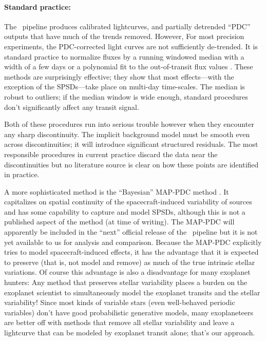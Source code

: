 \documentclass[letterpaper,12pt,preprint]{hack_aastex}
\begin{document}
\paragraph{Standard practice:}
The \Kepler\ pipeline produces calibrated lightcurves, and partially
detrended ``PDC'' outputs that have much of the trends removed.
However, For most precision experiments, the PDC-corrected light curves
are not sufficiently de-trended.
It is standard practice to normalize fluxes by a
running windowed median with a width of a few days \citep{dressing} or a
polynomial fit to the out-of-transit flux values \citep[regions chosen by
hand;][]{autokep}.
These methods are surprisingly effective; they show that most effects---with
the exception of the SPSDs---take place on multi-day time-scales.
The median is robust to outliers; if the median window is
wide enough, standard procedures don't significantly affect any
transit signal.

Both of these procedures run into serious trouble however when they encounter
any sharp discontinuity.
The implicit background model must be smooth even across discontinuities; it
will introduce significant structured residuals.
The most responsible procedures in current practice discard the data
near the discontinuities but no literature source is clear on how these points
are identified in practice.

A more sophisticated method is the ``Bayesian'' MAP-PDC method
\citep{map-pdc1,map-pdc2}.
It capitalizes on spatial
continuity of the spacecraft-induced variability of sources and
has some capability to capture and model SPSDs, although this is not
a published aspect of the method (at time of writing).
The MAP-PDC will apparently be included in the ``next'' official release of the
\Kepler\ pipeline but it is not yet available to us for analysis and comparison.
Because the MAP-PDC explicitly tries to model spacecraft-induced effects, it
has the advantage that it is expected to preserve (that is, not model and
remove) as much of the true intrinsic stellar variations.
Of course this advantage is also a disadvantage for many exoplanet hunters:
Any method that preserves stellar variability places a burden on the exoplanet
scientist to simultaneously model the exoplanet transits and the stellar
variability!
Since most kinds of variable stars (even well-behaved periodic variables)
don't have good probabilistic generative models, many exoplaneteers are better
off with methods that remove all stellar variability and leave a lightcurve
that can be modeled by exoplanet transit alone; that's our approach.
\end{document}
